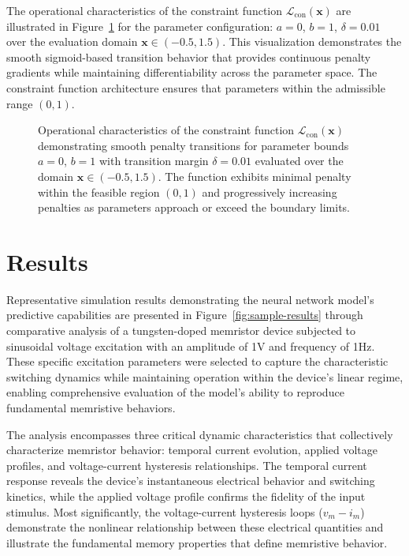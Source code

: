\documentclass[11pt, oneside]{article}
\begin{document}
The operational characteristics of the constraint function $\mathcal{L}_{\mathrm{con}}(\mathbf{x})$ are illustrated in Figure~\ref{fig:constrains} for the parameter configuration: $a=0$, $b=1$, $\delta=0.01$ over the evaluation domain $\mathbf{x} \in (-0.5, 1.5)$. This visualization demonstrates the smooth sigmoid-based transition behavior that provides continuous penalty gradients while maintaining differentiability across the parameter space. The constraint function architecture ensures that parameters within the admissible range $(0,1)$.

\begin{figure}[H]
    \centering
    \resizebox{0.5\linewidth}{!}{%
        
    }
    \caption{Operational characteristics of the constraint function $\mathcal{L}_{\mathrm{con}}(\mathbf{x})$ demonstrating smooth penalty transitions for parameter bounds $a=0$, $b=1$ with transition margin $\delta=0.01$ evaluated over the domain $\mathbf{x} \in (-0.5, 1.5)$. The function exhibits minimal penalty within the feasible region $(0,1)$ and progressively increasing penalties as parameters approach or exceed the boundary limits.}
    \label{fig:constrains}
\end{figure}





\section{Results}

Representative simulation results demonstrating the neural network model's predictive capabilities are presented in Figure~\ref{fig:sample-results} through comparative analysis of a tungsten-doped memristor device subjected to sinusoidal voltage excitation with an amplitude of 1V and frequency of 1Hz. These specific excitation parameters were selected to capture the characteristic switching dynamics while maintaining operation within the device's linear regime, enabling comprehensive evaluation of the model's ability to reproduce fundamental memristive behaviors.

The analysis encompasses three critical dynamic characteristics that collectively characterize memristor behavior: temporal current evolution, applied voltage profiles, and voltage-current hysteresis relationships. The temporal current response reveals the device's instantaneous electrical behavior and switching kinetics, while the applied voltage profile confirms the fidelity of the input stimulus. Most significantly, the voltage-current hysteresis loops ($v_m - i_m$) demonstrate the nonlinear relationship between these electrical quantities and illustrate the fundamental memory properties that define memristive behavior.
\end{document}
